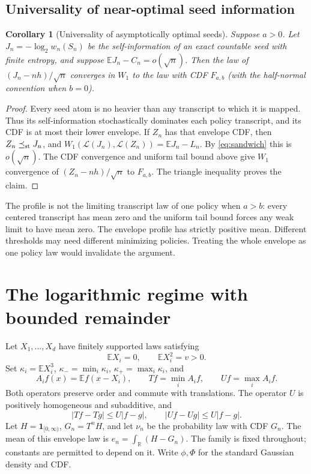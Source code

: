 \documentclass[11pt,a4paper]{article}
\newtheorem{corollary}[theorem]{Corollary}
\theoremstyle{definition}\newtheorem{definition}[theorem]{Definition}
\theoremstyle{remark}\newtheorem{remark}[theorem]{Remark}
\newcommand{\E}{\mathbb E}
\newcommand{\R}{\mathbb R}
\numberwithin{equation}{section}
\begin{document}
\subsection{Universality of near-optimal seed information}
\begin{corollary}[Universality of asymptotically optimal seeds]
Suppose $a>0$. Let $J_n=-\log_2 w_n(S_n)$ be the self-information of an
exact countable seed with finite entropy, and suppose $\E J_n-C_n=o(\sqrt n)$.
Then the law of $(J_n-nh)/\sqrt n$ converges in $W_1$ to the law with CDF
$F_{a,b}$ (with the half-normal convention when $b=0$).
\end{corollary}
\begin{proof}
Every seed atom is no heavier than any transcript to which it is mapped.
Thus its self-information stochastically dominates each policy transcript,
and its CDF is at most their lower envelope. If $Z_n$ has that envelope CDF,
then $Z_n\preceq_{\rm st}J_n$, and
$W_1(\mathcal L(J_n),\mathcal L(Z_n))=\E J_n-L_n$.
By \eqref{eq:sandwich} this is $o(\sqrt n)$. The CDF convergence and uniform
tail bound above give $W_1$ convergence of $(Z_n-nh)/\sqrt n$ to $F_{a,b}$.
The triangle inequality proves the claim.
\end{proof}

The profile is not the limiting transcript law of one policy when $a>b$:
every centered transcript has mean zero and the uniform tail bound forces
any weak limit to have mean zero. The envelope profile has strictly positive
mean. Different thresholds may need different minimizing policies. Treating
the whole envelope as one policy law would invalidate the argument.


\section{The logarithmic regime with bounded remainder}\label{sec:log}
Let $X_1,\ldots,X_d$ have finitely supported laws satisfying
\[
 \E X_i=0,\qquad \E X_i^2=v>0.
\]
Set $\kappa_i=\E X_i^3$, $\kappa_-=\min_i\kappa_i$,
$\kappa_+=\max_i\kappa_i$, and
\[
 A_i f(x)=\E f(x-X_i),\qquad
 Tf=\min_i A_i f,\qquad Uf=\max_i A_i f.
\]
Both operators preserve order and commute with translations. The
operator $U$ is positively homogeneous and subadditive, and
\begin{equation}\label{log:eq:lip}
 |Tf-Tg|\le U|f-g|,\qquad |Uf-Ug|\le U|f-g|.
\end{equation}
Let $H=\mathbf1_{[0,\infty)}$, $G_n=T^nH$, and let $\nu_n$ be the
probability law with CDF $G_n$. The mean of this envelope law is
$e_n=\int_\R(H-G_n)$. The family is fixed throughout; constants
are permitted to depend on it. Write $\phi,\Phi$ for the standard
Gaussian density and CDF.
\end{document}
